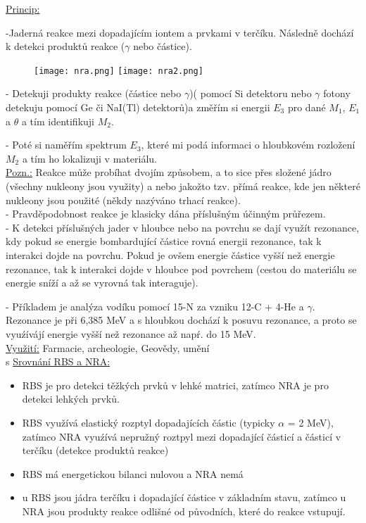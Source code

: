 \underline{Princip:}

-Jaderná reakce mezi dopadajícím iontem a prvkami v terčíku. Následně dochází k detekci produktů reakce ($\gamma$ nebo částice).

\begin{figure}[ht!]
	\texttt{[image: nra.png]}
	\texttt{[image: nra2.png]}
\end{figure}

- Detekuji produkty reakce (částice nebo $\gamma$)( pomocí Si detektoru nebo $\gamma$ fotony detekuju pomocí Ge či NaI(Tl) detektorů)a změřím si energii $E_3$ pro dané $M_1$, $E_1$ a $\theta$ a tím identifikuji $M_2$.

- Poté si naměřím spektrum $E_3$, které mi podá informaci o hloubkovém rozložení $M_2$ a tím ho lokalizuji v materiálu.
\\

\underline{Pozn.:} Reakce může probíhat dvojím způsobem, a to sice přes složené jádro (všechny nukleony jsou využity) a nebo jakožto tzv. přímá reakce, kde jen některé nukleony jsou použité (někdy nazýváno trhací reakce).
\\

- Pravděpodobnost reakce je klasicky dána příslušným účinným průřezem.
\\

- K detekci příslušných jader v hloubce nebo na povrchu se dají využít rezonance, kdy pokud se energie bombardující částice rovná energii rezonance, tak k interakci dojde na povrchu. Pokud je ovšem energie částice vyšší než energie rezonance, tak k interakci dojde v hloubce pod povrchem (cestou do materiálu se energie sníží a až se vyrovná tak interaguje).

- Příkladem je analýza vodíku pomocí 15-N za vzniku 12-C + 4-He a $\gamma$. Rezonance je při 6,385 MeV a s hloubkou dochází k posuvu rezonance, a proto se vyuźívájí energie vyšší než rezonance až napŕ. do 15 MeV.
\\

\underline{Využití:} Farmacie, archeologie, Geovědy, umění
\\
s
\underline{Srovnání RBS a NRA:}

\begin{itemize}
    \item RBS je pro detekci těžkých prvků v lehké matrici, zatímco NRA je pro detekci lehkých prvků.
    \item RBS využívá elastický rozptyl dopadajících částic (typicky $\alpha$ = 2 MeV), zatímco NRA vyuźívá nepružný roztpyl mezi dopadající částicí a částicí v terčíku (detekce produktů reakce)
    \item RBS má energetickou bilanci nulovou a NRA nemá
    \item u RBS jsou jádra terčíku i dopadající částice v základním stavu, zatímco u NRA jsou produkty reakce odlišné od původních, které do reakce vstupují.
\end{itemize}

